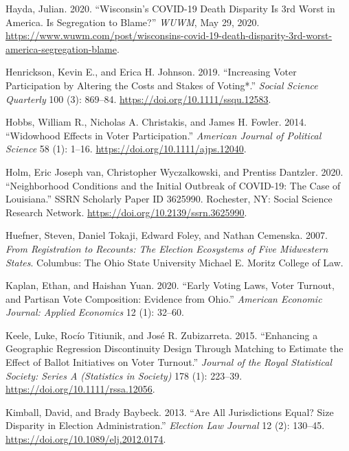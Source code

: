 \documentclass[
  12pt,
]{article}
\newlength{\cslhangindent}
\newenvironment{cslreferences}%
  {\setlength{\parindent}{0pt}%
  \everypar{\setlength{\hangindent}{\cslhangindent}}\ignorespaces}%
  {\par}
\begin{document}
\begin{cslreferences}
\leavevmode\hypertarget{ref-Hayda2020}{}%
Hayda, Julian. 2020. ``Wisconsin's COVID-19 Death Disparity Is 3rd Worst in America. Is Segregation to Blame?'' \emph{WUWM}, May 29, 2020. \url{https://www.wuwm.com/post/wisconsins-covid-19-death-disparity-3rd-worst-america-segregation-blame}.

\leavevmode\hypertarget{ref-Henrickson2019}{}%
Henrickson, Kevin E., and Erica H. Johnson. 2019. ``Increasing Voter Participation by Altering the Costs and Stakes of Voting*.'' \emph{Social Science Quarterly} 100 (3): 869--84. \url{https://doi.org/10.1111/ssqu.12583}.

\leavevmode\hypertarget{ref-Hobbs2014}{}%
Hobbs, William R., Nicholas A. Christakis, and James H. Fowler. 2014. ``Widowhood Effects in Voter Participation.'' \emph{American Journal of Political Science} 58 (1): 1--16. \url{https://doi.org/10.1111/ajps.12040}.

\leavevmode\hypertarget{ref-vanHolm2020}{}%
Holm, Eric Joseph van, Christopher Wyczalkowski, and Prentiss Dantzler. 2020. ``Neighborhood Conditions and the Initial Outbreak of COVID-19: The Case of Louisiana.'' SSRN Scholarly Paper ID 3625990. Rochester, NY: Social Science Research Network. \url{https://doi.org/10.2139/ssrn.3625990}.

\leavevmode\hypertarget{ref-Huefner2007}{}%
Huefner, Steven, Daniel Tokaji, Edward Foley, and Nathan Cemenska. 2007. \emph{From Registration to Recounts: The Election Ecosystems of Five Midwestern States}. Columbus: The Ohio State University Michael E. Moritz College of Law.

\leavevmode\hypertarget{ref-Kaplan2020}{}%
Kaplan, Ethan, and Haishan Yuan. 2020. ``Early Voting Laws, Voter Turnout, and Partisan Vote Composition: Evidence from Ohio.'' \emph{American Economic Journal: Applied Economics} 12 (1): 32--60.

\leavevmode\hypertarget{ref-Keele2015}{}%
Keele, Luke, Rocío Titiunik, and José R. Zubizarreta. 2015. ``Enhancing a Geographic Regression Discontinuity Design Through Matching to Estimate the Effect of Ballot Initiatives on Voter Turnout.'' \emph{Journal of the Royal Statistical Society: Series A (Statistics in Society)} 178 (1): 223--39. \url{https://doi.org/10.1111/rssa.12056}.

\leavevmode\hypertarget{ref-Kimball2013}{}%
Kimball, David, and Brady Baybeck. 2013. ``Are All Jurisdictions Equal? Size Disparity in Election Administration.'' \emph{Election Law Journal} 12 (2): 130--45. \url{https://doi.org/10.1089/elj.2012.0174}.


\end{cslreferences}
\end{document}
